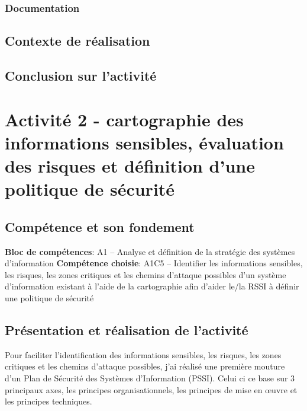 \documentclass[a4paper, 11pt]{report}
\begin{document}
\subsubsection{Documentation}
\subsection{Contexte de réalisation}
\subsection{Conclusion sur l'activité}

\section{Activité 2 - cartographie des informations sensibles, évaluation des risques et définition d'une politique de sécurité}
\subsection{Compétence et son fondement}
\textbf{Bloc de compétences}: A1 – Analyse et définition de la stratégie des systèmes d’information
\newline
\textbf{Compétence choisie}: A1C5 – Identifier les informations sensibles, les risques, les zones critiques et les chemins d’attaque possibles d’un système d’information existant à l’aide de la cartographie afin d’aider le/la RSSI à définir une politique de sécurité
\subsection{Présentation et réalisation de l'activité}
  Pour faciliter l'identification des informations sensibles, les risques, les zones critiques et les chemins d’attaque possibles, j'ai réalisé une première mouture d'un Plan de Sécurité des Systèmes d'Information (PSSI).
  Celui ci ce base sur 3 principaux axes, les principes organisationnels, les principes de mise en œuvre et les principes techniques.
\end{document}
